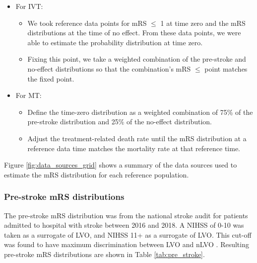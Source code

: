 \begin{enumerate}
\begin{itemize}
        \item For IVT:
        \begin{itemize}
            \item We took reference data points for mRS $\leq$ 1 at time zero and the mRS distributions at the time of no effect. From these data points, we were able to estimate the probability distribution at time zero.
            \item Fixing this point, we take a weighted combination of the pre-stroke and no-effect distributions so that the combination's mRS $\leq$ point matches the fixed point.
        \end{itemize}     
    \end{itemize}
    \begin{itemize}
        \item For MT:
        \begin{itemize}
            \item Define the time-zero distribution as a weighted combination of 75\% of the pre-stroke distribution and 25\% of the no-effect distribution.
            \item Adjust the treatment-related death rate until the mRS distribution at a reference data time matches the mortality rate at that reference time. 
        \end{itemize}
    \end{itemize}    
\end{enumerate}

Figure \ref{fig:data_sources_grid} shows a summary of the data sources used to estimate the mRS distribution for each reference population.%



\subsubsection{Pre-stroke mRS distributions}

The pre-stroke mRS distribution was from the national stroke audit for patients admitted to hospital with stroke between 2016 and 2018. A NIHSS of 0-10 was taken as a surrogate of LVO, and NIHSS 11+ as a surrogate of LVO. This cut-off was found to have maximum discrimination between LVO and nLVO \cite{perez_de_la_ossa_effect_2022}. Resulting pre-stroke mRS distributions are shown in Table \ref{tab:pre_stroke}.

